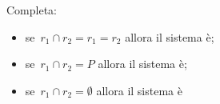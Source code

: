 \begin{esercizio}
 \label{ese:22.43}
Completa:

\begin{itemize}
\item se~\(r_{1}\cap r_{2}=r_{1}=r_{2}\) allora il sistema è\dotfill;
\item se~\(r_{1}\cap r_{2}=P\) allora il sistema è\dotfill;
\item se~\(r_{1}\cap r_{2}=\emptyset \) allora il sistema è\dotfill
\end{itemize}
\end{esercizio}

% 
% 
% 
